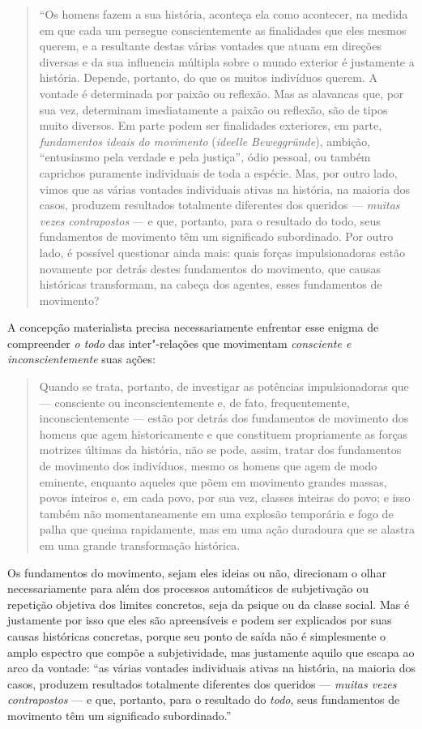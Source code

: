 \begin{quote}
``Os homens fazem a sua história, aconteça ela como acontecer, na medida
em que cada um persegue conscientemente as finalidades que eles mesmos
querem, e a resultante destas várias vontades que atuam em direções
diversas e da sua influencia múltipla sobre o mundo exterior é
justamente a história. Depende, portanto, do que os muitos indivíduos
querem. A vontade é determinada por paixão ou reflexão. Mas as alavancas
que, por sua vez, determinam imediatamente a paixão ou reflexão, são de
tipos muito diversos. Em parte podem ser finalidades exteriores, em
parte, \emph{fundamentos ideais do movimento} (\emph{ideelle
Beweggründe}), ambição, ``entusiasmo pela verdade e pela justiça'', ódio
pessoal, ou também caprichos puramente individuais de toda a espécie.
Mas, por outro lado, vimos que as várias vontades individuais ativas na
história, na maioria dos casos, produzem resultados totalmente
diferentes dos queridos --- \emph{muitas vezes contrapostos} --- e que,
portanto, para o resultado do todo, seus fundamentos de movimento têm um
significado subordinado. Por outro lado, é possível questionar ainda
mais: quais forças impulsionadoras estão novamente por detrás destes
fundamentos do movimento, que causas históricas transformam, na cabeça
dos agentes, esses fundamentos de movimento?
\end{quote}

A concepção materialista precisa necessariamente enfrentar esse enigma
de compreender \emph{o todo} das inter"-relações que movimentam
\emph{consciente e inconscientemente} suas ações:

\begin{quote}
Quando se trata, portanto, de investigar as potências impulsionadoras
que --- consciente ou inconscientemente e, de fato, frequentemente,
inconscientemente --- estão por detrás dos fundamentos de movimento dos
homens que agem historicamente e que constituem propriamente as forças
motrizes últimas da história, não se pode, assim, tratar dos fundamentos
de movimento dos indivíduos, mesmo os homens que agem de modo eminente,
enquanto aqueles que põem em movimento grandes massas, povos inteiros e,
em cada povo, por sua vez, classes inteiras do povo; e isso também não
momentaneamente em uma explosão temporária e fogo de palha que queima
rapidamente, mas em uma ação duradoura que se alastra em uma grande
transformação histórica.
\end{quote}

Os fundamentos do movimento, sejam eles ideias ou não, direcionam o
olhar necessariamente para além dos processos automáticos de
subjetivação ou repetição objetiva dos limites concretos, seja da psique
ou da classe social. Mas é justamente por isso que eles são apreensíveis
e podem ser explicados por suas causas históricas concretas, porque seu
ponto de saída não é simplesmente o amplo espectro que compõe a
subjetividade, mas justamente aquilo que escapa ao arco da vontade: ``as
várias vontades individuais ativas na história, na maioria dos casos,
produzem resultados totalmente diferentes dos queridos --- \emph{muitas
vezes contrapostos} --- e que, portanto, para o resultado do \emph{todo},
seus fundamentos de movimento têm um significado subordinado.''

